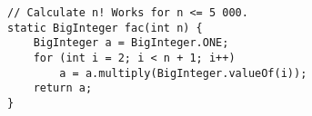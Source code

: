 \begin{verbatim}
// Calculate n! Works for n <= 5 000.
static BigInteger fac(int n) {
	BigInteger a = BigInteger.ONE;
	for (int i = 2; i < n + 1; i++) 
		a = a.multiply(BigInteger.valueOf(i));
	return a;
}
\end{verbatim}